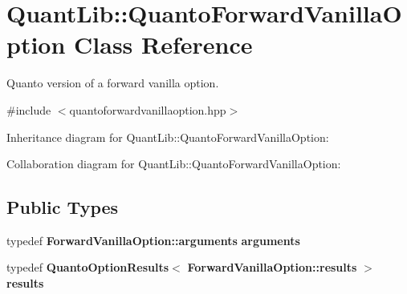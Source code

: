 \section{Quant\+Lib\+:\+:Quanto\+Forward\+Vanilla\+Option Class Reference}
\label{class_quant_lib_1_1_quanto_forward_vanilla_option}


Quanto version of a forward vanilla option.  




{\ttfamily \#include $<$quantoforwardvanillaoption.\+hpp$>$}



Inheritance diagram for Quant\+Lib\+:\+:Quanto\+Forward\+Vanilla\+Option\+:


Collaboration diagram for Quant\+Lib\+:\+:Quanto\+Forward\+Vanilla\+Option\+:
\subsection*{Public Types}
\begin{DoxyCompactItemize}
\item 
typedef {\bf Forward\+Vanilla\+Option\+::arguments} {\bfseries arguments}\label{class_quant_lib_1_1_quanto_forward_vanilla_option_ac874e11a5caeb531bbc5e7ba24fa2dc5}

\item 
typedef {\bf Quanto\+Option\+Results}$<$ {\bf Forward\+Vanilla\+Option\+::results} $>$ {\bfseries results}\label{class_quant_lib_1_1_quanto_forward_vanilla_option_a489e8a6973382dc2f2fe2e5d77182e20}

\end{DoxyCompactItemize}
